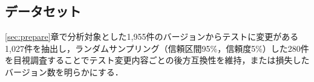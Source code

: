 \documentclass[submit]{ipsj}
\begin{document}




\subsection{データセット}\label{rq1:datasets}

\ref{sec:prepare}章で分析対象とした1,955件のバージョンからテストに変更がある1,027件を抽出し，ランダムサンプリング（信頼区間95\%，信頼度5\%）した280件を目視調査することでテスト変更内容ごとの後方互換性を維持，または損失したバージョン数を明らかにする．
\end{document}
